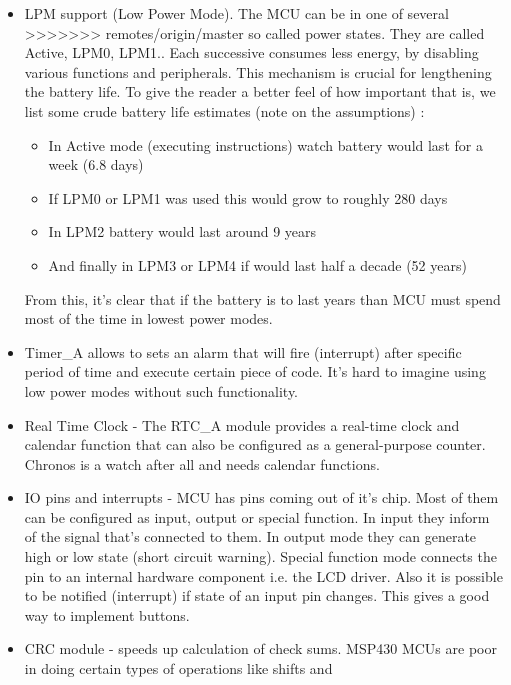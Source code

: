 \begin{commnet}
\begin{itemize}
  \item LPM support (Low Power Mode). The MCU can be in one of several
>>>>>>> remotes/origin/master
        so called power states. They are called Active, LPM0, LPM1.. 
        Each successive consumes less energy, by disabling various
        functions and peripherals. This mechanism is crucial for
        lengthening the battery life. To give the reader a better feel of
        how important that is, we list some crude battery life
        estimates (note on the assumptions) :
\begin{itemize}
        \item In Active mode (executing instructions) watch battery would
        last for a week (6.8 days)
        \item If LPM0 or LPM1 was used this would grow to roughly 280 days
        \item In LPM2 battery would last around 9 years
        \item And finally in LPM3 or LPM4 if would last half a decade (52
        years)
\end{itemize}
        From this, it's clear that if the battery is to last years
        than MCU must spend most of the time in lowest power modes.
 \item Timer\_A allows to sets an alarm that will fire (interrupt) after specific
       period of time and execute certain piece of code. It's hard to
       imagine using low power modes without such functionality.
 \item Real Time Clock - The RTC\_A module provides a real-time clock
       and calendar function that can also be configured as a
       general-purpose counter. Chronos is a watch after all and needs
       calendar functions.
 \item IO pins and interrupts - MCU has pins coming out of it's chip.
       Most of them can be configured as input, output or special
       function. In input they inform of the signal that's connected to
       them. In output mode they can generate high or low state (short
       circuit warning). Special function mode connects the pin to an
       internal hardware component i.e. the LCD driver.
       Also it is possible to be notified (interrupt) if state of an
       input pin changes. This gives a good way to implement buttons.
 \item CRC module - speeds up calculation of check sums. MSP430 MCUs
       are poor in doing certain types of operations like shifts and

\end{itemize}
\end{commnet}
